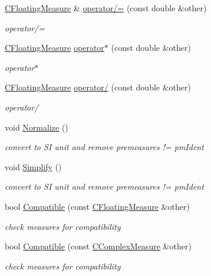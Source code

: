 \begin{DoxyCompactItemize}
\hyperlink{classCFloatingMeasure}{C\+Floating\+Measure} \& \hyperlink{classCFloatingMeasure_a2ba332fa822922d51866e4361db1677b}{operator/=} (const double \&other)
\begin{DoxyCompactList}\small\item\em operator/= \end{DoxyCompactList}\item 
\hyperlink{classCFloatingMeasure}{C\+Floating\+Measure} \hyperlink{classCFloatingMeasure_a31cedd2120675c56064e12556432f550}{operator$\ast$} (const double \&other)
\begin{DoxyCompactList}\small\item\em operator$\ast$ \end{DoxyCompactList}\item 
\hyperlink{classCFloatingMeasure}{C\+Floating\+Measure} \hyperlink{classCFloatingMeasure_ac39b5a05cce42097d4439627aaaaf94c}{operator/} (const double \&other)
\begin{DoxyCompactList}\small\item\em operator/ \end{DoxyCompactList}\item 
void \hyperlink{classCFloatingMeasure_af4e2cc6a78b8e0cda11df432902bde8a}{Normalize} ()
\begin{DoxyCompactList}\small\item\em convert to SI unit and remove premeasures != pm\+Ident \end{DoxyCompactList}\item 
void \hyperlink{classCFloatingMeasure_a47731afb871889ee7da5f84b40e3a27f}{Simplify} ()
\begin{DoxyCompactList}\small\item\em convert to SI unit and remove premeasures != pm\+Ident \end{DoxyCompactList}\item 
bool \hyperlink{classCFloatingMeasure_ae69672971857cf047c5bc7ab4b631b6c}{Compatible} (const \hyperlink{classCFloatingMeasure}{C\+Floating\+Measure} \&other)
\begin{DoxyCompactList}\small\item\em check measures for compatibility \end{DoxyCompactList}\item 
bool \hyperlink{classCFloatingMeasure_a5cf69c287abe4e2f65242e97093f7595}{Compatible} (const \hyperlink{classCComplexMeasure}{C\+Complex\+Measure} \&other)
\begin{DoxyCompactList}\small\item\em check measures for compatibility \end{DoxyCompactList}\item 

\end{DoxyCompactItemize}
